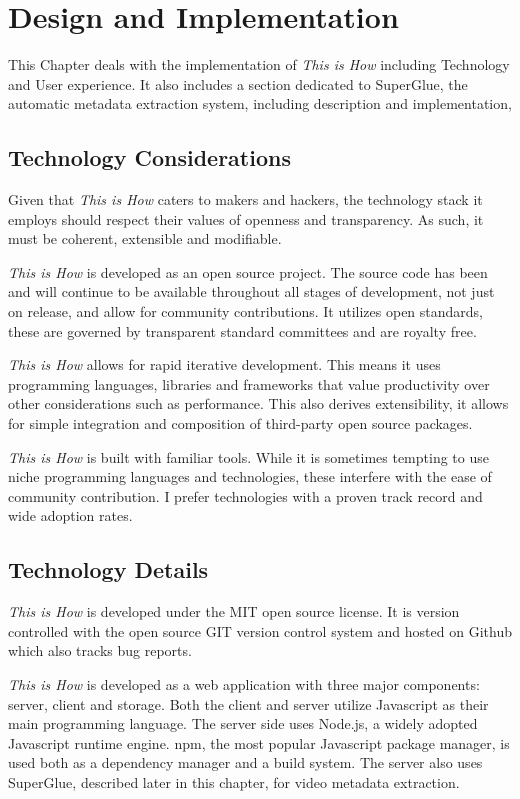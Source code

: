 \chapter{Design and Implementation}
\label{chap_design}

This Chapter deals with the implementation of \textit{This is How} including Technology and User experience. It also includes a section dedicated to SuperGlue, the automatic metadata extraction system, including description and implementation, 

\section{Technology Considerations}

Given that \textit{This is How} caters to makers and hackers, the technology stack it employs should respect their values of openness and transparency. As such, it must be coherent, extensible and modifiable.
 
\textit{This is How} is developed as an open source project. The source code has been and will continue to be available throughout all stages of development, not just on release, and allow for community contributions. It utilizes open standards, these are governed by transparent standard committees and are royalty free. 

\textit{This is How} allows for rapid iterative development. This means it uses programming languages, libraries and frameworks that value productivity over other considerations such as performance. This also derives extensibility, it allows for simple integration and composition of third-party open source packages. 

\textit{This is How} is built with familiar tools. While it is sometimes tempting to use niche programming languages and technologies, these interfere with the ease of community contribution. I prefer technologies with a proven track record and wide adoption rates.

\section{Technology Details}

\textit{This is How} is developed under the MIT open source license. It is version controlled with the open source GIT\cite{git} version control system and hosted on Github\cite{github} which also tracks bug reports. 

\textit{This is How} is developed as a web application with three major components: server, client and storage. Both the client and server utilize Javascript as their main programming language. The server side uses Node.js, a widely adopted Javascript runtime engine. npm\cite{npm}, the most popular Javascript package manager, is used both as a dependency manager and a build system. The server also uses SuperGlue, described later in this chapter, for video metadata extraction.

